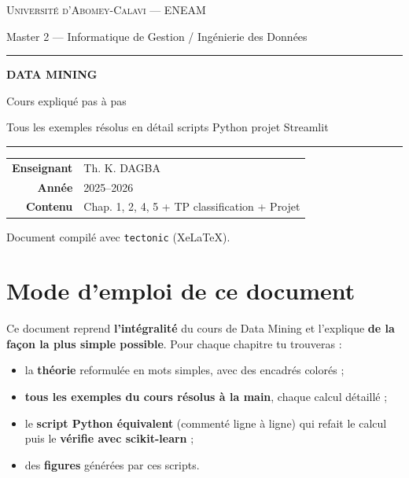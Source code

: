 \documentclass[11pt,a4paper]{report}
\begin{document}
\begin{titlepage}
\centering
\vspace*{1.5cm}
{\Large\scshape Université d'Abomey-Calavi — ENEAM\par}
{\large Master 2 — Informatique de Gestion / Ingénierie des Données\par}
\vspace{2.2cm}
{\color{bleuclair}\rule{\linewidth}{2pt}}\par
\vspace{0.8cm}
{\Huge\bfseries\color{bleu} DATA MINING\par}
\vspace{0.5cm}
{\LARGE Cours expliqué pas à pas\par}
\vspace{0.3cm}
{\large Tous les exemples résolus en détail \textbullet{} scripts Python \textbullet{} projet Streamlit\par}
\vspace{0.8cm}
{\color{bleuclair}\rule{\linewidth}{2pt}}\par
\vspace{2.5cm}
\begin{tabular}{rl}
\textbf{Enseignant} & Th. K. DAGBA\\[4pt]
\textbf{Année} & 2025--2026\\[4pt]
\textbf{Contenu} & Chap. 1, 2, 4, 5 + TP classification + Projet\\
\end{tabular}
\vfill
{\small Document compilé avec \texttt{tectonic} (XeLaTeX).\par}
\end{titlepage}

\tableofcontents
\clearpage

\chapter*{Mode d'emploi de ce document}

Ce document reprend \textbf{l'intégralité} du cours de Data Mining et l'explique
\textbf{de la façon la plus simple possible}. Pour chaque chapitre tu trouveras :

\begin{itemize}[leftmargin=1.4em]
  \item la \textbf{théorie} reformulée en mots simples, avec des encadrés colorés ;
  \item \textbf{tous les exemples du cours résolus à la main}, chaque calcul détaillé ;
  \item le \textbf{script Python équivalent} (commenté ligne à ligne) qui refait le
        calcul puis le \textbf{vérifie avec scikit-learn} ;
  \item des \textbf{figures} générées par ces scripts.
\end{itemize}
\end{document}
